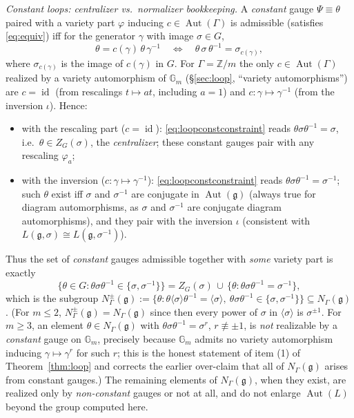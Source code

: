 \documentclass{amsart}
\theoremstyle{definition}
\DeclareMathOperator{\Aut}{Aut}
\DeclareMathOperator{\id}{id}
\newcommand{\Gm}{\mathbb{G}_m}
\newcommand{\g}{\mathfrak{g}}
\newcommand{\Z}{\mathbb{Z}}
\begin{document}
\emph{Constant loops: centralizer vs.\ normalizer bookkeeping.}  A
\emph{constant} gauge $\Psi\equiv\theta$ paired with a variety part
$\varphi$ inducing $c\in\Aut(\Gamma)$ is admissible (satisfies
\eqref{eq:equiv}) iff for the generator $\gamma$ with image $\sigma\in G$,
\begin{equation}\label{eq:loopconstconstraint}
\theta=c(\gamma)\,\theta\,\gamma^{-1}
\quad\Longleftrightarrow\quad
\theta\,\sigma\,\theta^{-1}=\sigma_{c(\gamma)},
\end{equation}
where $\sigma_{c(\gamma)}$ is the image of $c(\gamma)$ in $G$.  For
$\Gamma=\Z/m$ the only $c\in\Aut(\Gamma)$ realized by a variety
automorphism of $\Gm$ (\S\ref{sec:loop}, ``variety automorphisms'') are
$c=\id$ (from rescalings $t\mapsto at$, including $a=1$) and
$c\colon\gamma\mapsto\gamma^{-1}$ (from the inversion $\iota$).  Hence:
\begin{itemize}
\item with the rescaling part ($c=\id$): \eqref{eq:loopconstconstraint}
reads $\theta\sigma\theta^{-1}=\sigma$, i.e.\ $\theta\in Z_G(\sigma)$, the
\emph{centralizer}; these constant gauges pair with any rescaling
$\varphi_a$;
\item with the inversion ($c\colon\gamma\mapsto\gamma^{-1}$):
\eqref{eq:loopconstconstraint} reads $\theta\sigma\theta^{-1}=\sigma^{-1}$;
such $\theta$ exist iff $\sigma$ and $\sigma^{-1}$ are conjugate in
$\Aut(\g)$ (always true for diagram automorphisms, as $\sigma$ and
$\sigma^{-1}$ are conjugate diagram automorphisms), and they pair with the
inversion $\iota$ (consistent with $L(\g,\sigma)\cong L(\g,\sigma^{-1})$).
\end{itemize}
Thus the set of \emph{constant} gauges admissible together with \emph{some}
variety part is exactly
\[
\{\theta\in G:\theta\sigma\theta^{-1}\in\{\sigma,\sigma^{-1}\}\}
=Z_G(\sigma)\,\cup\,\{\theta:\theta\sigma\theta^{-1}=\sigma^{-1}\},
\]
which is the subgroup $N^{\pm}_\Gamma(\g):=\{\theta:\theta\langle\sigma
\rangle\theta^{-1}=\langle\sigma\rangle,\ \theta\sigma\theta^{-1}\in\{\sigma,
\sigma^{-1}\}\}\subseteq N_\Gamma(\g)$.  (For $m\le2$, $N^\pm_\Gamma(\g)=
N_\Gamma(\g)$ since then every power of $\sigma$ in $\langle\sigma\rangle$ is
$\sigma^{\pm1}$.  For $m\ge3$, an element $\theta\in N_\Gamma(\g)$ with
$\theta\sigma\theta^{-1}=\sigma^{r}$, $r\not\equiv\pm1$, is \emph{not}
realizable by a \emph{constant} gauge on $\Gm$, precisely because $\Gm$
admits no variety automorphism inducing $\gamma\mapsto\gamma^{r}$ for such
$r$; this is the honest statement of item (1) of Theorem~\ref{thm:loop} and
corrects the earlier over-claim that all of $N_\Gamma(\g)$ arises from
constant gauges.)  The remaining elements of $N_\Gamma(\g)$, when they
exist, are realized only by \emph{non-constant} gauges or not at all, and do
not enlarge $\Aut(L)$ beyond the group computed here.
\end{document}
